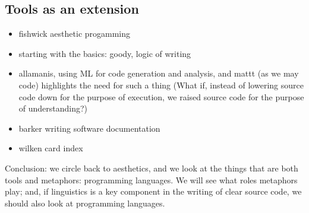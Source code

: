 \subsection{Tools as an extension}

\begin{itemize}
    \item fishwick aesthetic progamming
    \item starting with the basics: goody, logic of writing
    \item allamanis, using ML for code generation and analysis, and mattt (as we may code) highlights the need for such a thing (What if, instead of lowering source code down for the purpose of execution, we raised source code for the purpose of understanding?)
    \item barker writing software documentation
    \item wilken card index
\end{itemize}


\pagebreak

Conclusion: we circle back to aesthetics, and we look at the things that are both tools and metaphors: programming languages. We will see what roles metaphors play; and, if linguistics is a key component in the writing of clear source code, we should also look at programming languages.
